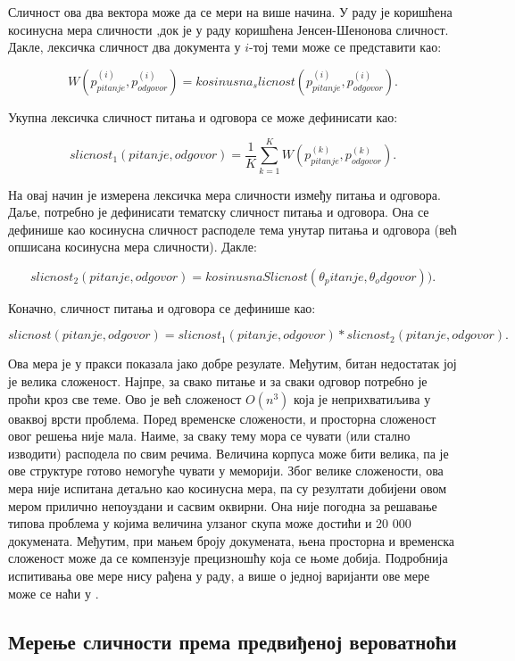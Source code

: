 Сличност ова два вектора може да се мери на више начина. У раду је коришћена косинусна мера сличности ,док је у раду \cite{tm2} коришћена Јенсен-Шенонова сличност. Дакле, лексичка сличност два документа у $i$-тој теми може се представити као:

$$
W(p_{pitanje}^{(i)},p_{odgovor}^{(i)}) = kosinusna_slicnost(p_{pitanje}^{(i)},p_{odgovor}^{(i)}).
$$

Укупна лексичка сличност питања и одговора се може дефинисати као:

$$
slicnost_1(pitanje,odgovor) = \frac{1}{K}\sum_{k=1}^K W(p_{pitanje}^{(k)},p_{odgovor}^{(k)}).
$$


На овај начин је измерена лексичка мера сличности између питања и одговора. Даље, потребно је дефинисати тематску сличност питања и одговора. Она се дефинише као косинусна сличност расподеле тема унутар питања и одговора (већ опшисана косинусна мера сличности). Дакле:

$$
slicnost_2(pitanje,odgovor) =kosinusnaSlicnost(\theta_pitanje,\theta_odgovor)).
$$

Коначно, сличност питања и одговора се дефинише као:

$$
slicnost(pitanje,odgovor) = slicnost_1(pitanje,odgovor)*slicnost_2(pitanje,odgovor).
$$

Ова мера је у пракси показала јако добре резулате. Међутим, битан недостатак јој је велика сложеност. Најпре, за свако питање и за сваки одговор потребно је проћи кроз све теме. Ово је већ сложеност $O(n^3)$ која је неприхватиљива у оваквој врсти проблема. Поред временске сложености, и просторна сложеност овог решења није мала. Наиме, за сваку тему мора се чувати (или стално изводити) расподела по свим речима. Величина корпуса може бити велика, па је ове структуре готово немогуће чувати у меморији. 
Због велике сложености, ова мера није испитана детаљно као косинусна мера, па су резултати добијени овом мером прилично непоуздани и сасвим оквирни. 
Она није погодна за решавање типова проблема у којима величина улзаног скупа може достићи и 20 000 докумената. Међутим, при мањем броју докумената, њена просторна и временска сложеност може да се компензује прецизношћу која се њоме добија. Подробнија испитивања ове мере нису рађена у  раду, а више о једној варијанти ове мере може се наћи у \cite{tm2}.

\subsection{Мерење сличности према предвиђеној вероватноћи}

